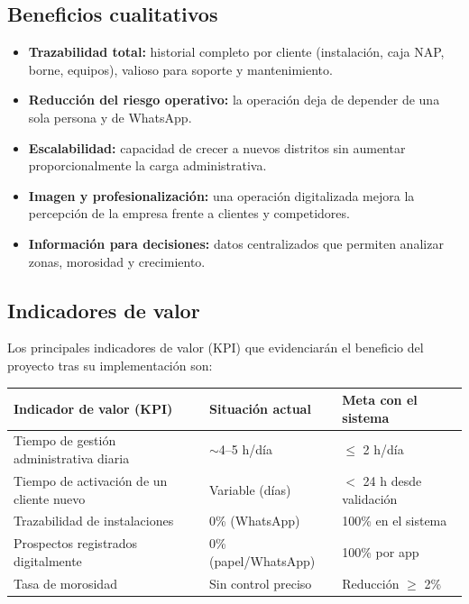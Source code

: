 \subsection{Beneficios cualitativos}

\begin{itemize}[leftmargin=1.4em]
  \item \textbf{Trazabilidad total:} historial completo por cliente (instalación,
  caja NAP, borne, equipos), valioso para soporte y mantenimiento.
  \item \textbf{Reducción del riesgo operativo:} la operación deja de depender de una
  sola persona y de WhatsApp.
  \item \textbf{Escalabilidad:} capacidad de crecer a nuevos distritos sin aumentar
  proporcionalmente la carga administrativa.
  \item \textbf{Imagen y profesionalización:} una operación digitalizada mejora la
  percepción de la empresa frente a clientes y competidores.
  \item \textbf{Información para decisiones:} datos centralizados que permiten
  analizar zonas, morosidad y crecimiento.
\end{itemize}

\subsection{Indicadores de valor}

Los principales indicadores de valor (KPI) que evidenciarán el beneficio del proyecto
tras su implementación son:

\begin{center}
\label{tab:kpi}
\begin{tabularx}{\textwidth}{L{4.2cm} X X}
\toprule
\textbf{Indicador de valor (KPI)} & \textbf{Situación actual} & \textbf{Meta con el sistema} \\
\midrule
Tiempo de gestión administrativa diaria & $\sim$4--5 h/día & $\le$ 2 h/día \\
Tiempo de activación de un cliente nuevo & Variable (días) & $<$ 24 h desde validación \\
Trazabilidad de instalaciones & 0\% (WhatsApp) & 100\% en el sistema \\
Prospectos registrados digitalmente & 0\% (papel/WhatsApp) & 100\% por app \\
Tasa de morosidad & Sin control preciso & Reducción $\ge$ 2\% \\
\bottomrule
\end{tabularx}
\end{center}

